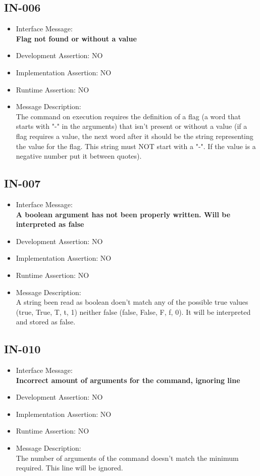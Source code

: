 \subsection{IN-006}
\begin{itemize}
  \item Interface Message:\\[1em]\textbf{Flag not found or without a value}
  \item Development Assertion: NO
  \item Implementation Assertion: NO
  \item Runtime Assertion: NO
  \item Message Description:\\[1em]The command on execution requires the definition of a flag (a word that starts with "-" in the arguments) that isn't present or without a value (if a flag requires a value, the next word after it should be the string representing the value for the flag. This string must NOT start with a "-". If the value is a negative number put it between quotes).
\end{itemize}

\subsection{IN-007}
\begin{itemize}
  \item Interface Message:\\[1em]\textbf{A boolean argument has not been properly written. Will be interpreted as false}
  \item Development Assertion: NO
  \item Implementation Assertion: NO
  \item Runtime Assertion: NO
  \item Message Description:\\[1em]A string been read as boolean doen't match any of the possible true values (true, True, T, t, 1) neither false (false, False, F, f, 0). It will be interpreted and stored as false.
\end{itemize}

\subsection{IN-010}
\begin{itemize}
  \item Interface Message:\\[1em]\textbf{Incorrect amount of arguments for the command, ignoring line}
  \item Development Assertion: NO
  \item Implementation Assertion: NO
  \item Runtime Assertion: NO
  \item Message Description:\\[1em]The number of arguments of the command doesn't match the minimum required. This line will be ignored.
\end{itemize}

